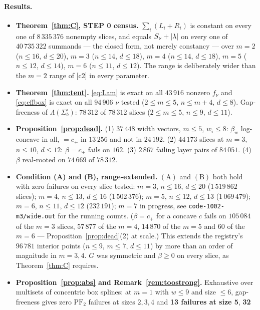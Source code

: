 \documentclass[11pt]{article}
\theoremstyle{definition}
\newcommand{\PFtwo}{\mathrm{PF}_2}
\DeclarePairedDelimiter{\abs}{\lvert}{\rvert}
\begin{document}
\paragraph{Results.}
\begin{itemize}
\item \textbf{Theorem~\ref{thm:C}, STEP 0 census.} $\sum_i(L_i+R_i)$ is constant on every
one of $8\,335\,376$ nonempty slices, and equals $S_\nu+\abs{\lambda}$ on every one of
$40\,735\,322$ summands --- the closed form, not merely constancy --- over
$m=2$ ($n\le16$, $d\le20$), $m=3$ ($n\le14$, $d\le18$), $m=4$ ($n\le14$, $d\le18$),
$m=5$ ($n\le12$, $d\le14$), $m=6$ ($n\le11$, $d\le12$). The range is deliberately wider
than the $m=2$ range of [c2] in every parameter.
\item \textbf{Theorem~\ref{thm:tent}.} \eqref{eq:Lam} is exact on all $43\,916$ nonzero
$f_\nu$ and \eqref{eq:effbox} is exact on all $94\,906$ $\nu$ tested ($2\le m\le5$,
$n\le m+4$, $d\le8$). Gap-freeness of $\Lambda(\Sigma^\circ_b)$: $78\,312$ of $78\,312$
slices ($2\le m\le5$, $n\le9$, $d\le11$).
\item \textbf{Proposition~\ref{prop:dead}.} (1) $37\,448$ width vectors, $m\le5$,
$w_i\le8$: $\beta_w$ log-concave in all, $=c_+$ in $13\,256$ and not in $24\,192$. (2)
$44\,173$ slices at $m=3$, $n\le10$, $d\le12$: $\beta=c_+$ fails on $162$. (3) $2\,867$
failing layer pairs of $84\,051$. (4) $\beta$ real-rooted on $74\,669$ of $78\,312$.
\item \textbf{Condition (A) and (B), range-extended.} $(\mathrm A)$ and $(\mathrm B)$ both
hold with zero failures on every slice tested: $m=3$, $n\le16$, $d\le20$
($1\,519\,862$ slices); $m=4$, $n\le13$, $d\le16$ ($1\,502\,376$); $m=5$, $n\le12$,
$d\le13$ ($1\,069\,479$); $m=6$, $n\le11$, $d\le12$ ($232\,191$); $m=7$ in progress, see
\verb|code-1002-m3/wide.out| for the running counts. ($\beta=c_+$ for a concave $c$ fails
on $105\,084$ of the $m=3$ slices, $57\,877$ of the $m=4$, $14\,870$ of the $m=5$ and $60$
of the $m=6$ ---
Proposition~\ref{prop:dead}(2) at scale.) This extends the registry's
$96\,781$ interior points ($n\le9$, $m\le7$, $d\le11$) by more than an order of magnitude
in $m=3,4$. $G$ was symmetric and $\beta\ge0$ on every slice, as
Theorem~\ref{thm:C} requires.
\item \textbf{Proposition~\ref{prop:abs} and Remark~\ref{rem:toostrong}.} Exhaustive over
multisets of concentric box splines: at $m=1$ with $w\le9$ and size $\le6$, gap-freeness
gives zero $\PFtwo$ failures at sizes $2,3,4$ and \textbf{13 failures at size 5}, \textbf{32
}
\end{itemize}
\end{document}
